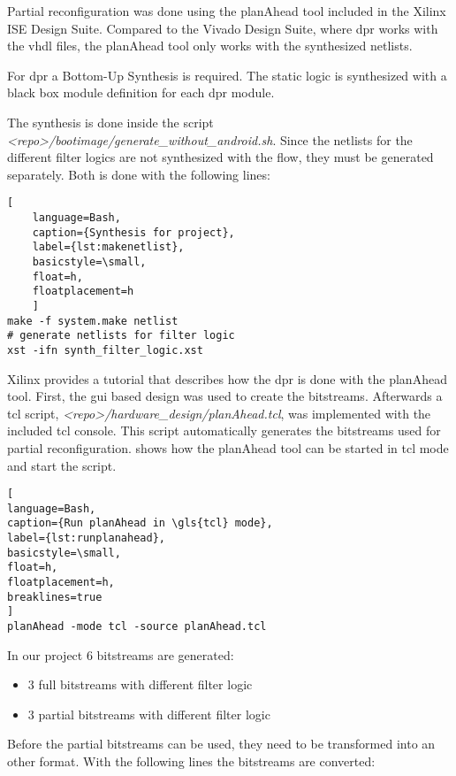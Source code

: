 Partial reconfiguration was done using the planAhead tool included in the Xilinx ISE Design Suite. Compared to the Vivado Design Suite, where \gls{dpr} works with the \gls{vhdl} files, the planAhead tool only works with the synthesized netlists.

For \gls{dpr} a Bottom-Up Synthesis is required. The static logic is synthesized with a black box module definition for each \gls{dpr} module.

The synthesis is done inside the script\\\emph{<repo>/bootimage/generate\_without\_android.sh}. Since the netlists for the different filter logics are not synthesized with the flow, they must be generated separately. Both is done with the following lines: 

\begin{lstlisting}[
	language=Bash,
	caption={Synthesis for project},
	label={lst:makenetlist},
	basicstyle=\small,
	float=h,
	floatplacement=h
	]
make -f system.make netlist
# generate netlists for filter logic
xst -ifn synth_filter_logic.xst
\end{lstlisting}

Xilinx provides a tutorial \cite{planAheadTutorial} that describes how the \gls{dpr} is done with the planAhead tool. First, the \gls{gui} based design was used to create the bitstreams. Afterwards a \gls{tcl} script, \emph{<repo>/hardware_design/planAhead.tcl}, was implemented with the included \gls{tcl} console. This script automatically generates the bitstreams used for partial reconfiguration.  shows how the planAhead tool can be started in \gls{tcl} mode and start the script.

\begin{lstlisting}[
language=Bash,
caption={Run planAhead in \gls{tcl} mode},
label={lst:runplanahead},
basicstyle=\small,
float=h,
floatplacement=h,
breaklines=true
]
planAhead -mode tcl -source planAhead.tcl
\end{lstlisting}

In our project $6$ bitstreams are generated:
\begin{itemize}
	\item $3$ full bitstreams with different filter logic
	\item $3$ partial bitstreams with different filter logic
\end{itemize}

Before the partial bitstreams can be used, they need to be transformed into an other format. With the following lines the bitstreams are converted:

